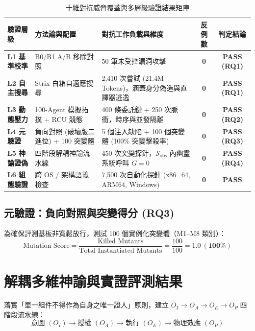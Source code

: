 \documentclass[conference]{IEEEtran}
\begin{document}
\begin{table}[!t]
\caption{十維對抗威脅覆蓋與多層級驗證結果矩陣}
\label{tab:adversarial_matrix_zh}
\centering
\begin{tabularx}{\textwidth}{l Y Y c c}
\toprule
\textbf{驗證層級} & \textbf{方法論與配置} & \textbf{對抗工作負載與維度} & \textbf{反例數} & \textbf{判定結論} \\
\midrule
\textbf{L1 基準校準} & B0/B1 A/B 移除對照 & 50 筆未受控漏洞攻擊 & \textbf{0} & \textbf{PASS (RQ1)} \\
\textbf{L2 自主搜尋} & Strix 白箱自適應搜尋 & 2,410 次嘗試 (21.4M Tokens)，涵蓋身分偽造與直譯器逃逸 & \textbf{0} & \textbf{PASS (RQ1)} \\
\textbf{L3 動態壓力} & 100-Agent 模擬拓撲 + RCU 競態 & 400 條委託鏈 + 250 次脈衝，時序與並發隔離 & \textbf{0} & \textbf{PASS (RQ2)} \\
\textbf{L4 元驗證} & 負向對照 (破壞版二進位) + 100 突變體 & 5 個注入缺陷 + 100 個突變體 (100\% 突變擊殺率) & \textbf{0} & \textbf{PASS (RQ3)} \\
\textbf{L5 神諭證偽} & 四階段解耦神諭流水線 & 450 次突變探針，$\mathcal{S}_{\text{obs}}$ 內幽靈系統呼叫 $G = 0$ & \textbf{0} & \textbf{PASS (RQ4)} \\
\textbf{L6 組態驗證} & 跨 OS / 架構語義檢查 & 7,500 次自動化探針 (x86\_64, ARM64, Windows) & \textbf{0} & \textbf{PASS} \\
\bottomrule
\end{tabularx}
\end{table}

\subsection{元驗證：負向對照與突變得分 (RQ3)}
為確保評測基板非寬鬆放行，測試 100 個實例化突變體（M1--M8 類別）：
\begin{equation}
\text{Mutation Score} = \frac{\text{Killed Mutants}}{\text{Total Instantiated Mutants}} = \frac{100}{100} = \mathbf{1.0\ (100\%)}
\end{equation}

\section{解耦多維神諭與實證評測結果}
落實「單一組件不得作為自身之唯一證人」原則，建立 $O_I \rightarrow O_A \rightarrow O_E \rightarrow O_P$ 四階段流水線：
\begin{equation}
\boxed{\text{意圖 } (O_I) \longrightarrow \text{授權 } (O_A) \longrightarrow \text{執行 } (O_E) \longrightarrow \text{物理效應 } (O_P)}
\end{equation}
\end{document}
